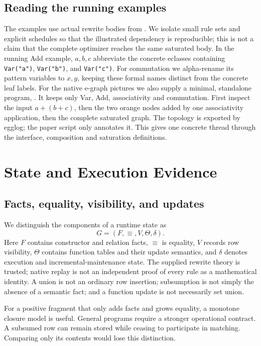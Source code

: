 \documentclass[11pt,a4paper]{article}
\newcommand{\code}[1]{\texttt{#1}}
\begin{document}
\subsection{Reading the running examples}
The examples use actual rewrite bodies from
. We isolate small rule sets and explicit
schedules so that the illustrated dependency is reproducible; this is not a
claim that the complete optimizer reaches the same saturated body. In the
running Add example, $a,b,c$ abbreviate the concrete eclasses containing
\code{Var("a")}, \code{Var("b")}, and \code{Var("c")}.
For commutation we alpha-rename its pattern variables to $x,y$, keeping these
formal names distinct from the concrete leaf labels.
For the native e-graph pictures we also supply a minimal, standalone program,
. It keeps only Var, Add, associativity and
commutation. First inspect the input $a+(b+c)$, then the two orange nodes added by
one associativity application, then the complete saturated graph. The topology is
exported by egglog; the paper script only annotates it. This gives one concrete
thread through the interface, composition and saturation definitions.

\MathLegend
\MathSharingComparison

\section{State and Execution Evidence}
\subsection{Facts, equality, visibility, and updates}
We distinguish the components of a runtime state as
\begin{equation}
 G=(F,\equiv,V,\Theta,\delta).
\end{equation}
Here $F$ contains constructor and relation facts, $\equiv$ is equality,
$V$ records row visibility, $\Theta$ contains function tables and their update
semantics, and $\delta$ denotes execution and incremental-maintenance state.
The supplied rewrite theory is trusted; native replay is not an independent
proof of every rule as a mathematical identity. A union is not an ordinary row insertion; subsumption is not simply the absence
of a semantic fact; and a function update is not necessarily set union.

For a positive fragment that only adds facts and grows equality, a monotone
closure model is useful. General programs require a stronger operational
contract. A subsumed row can remain stored while ceasing to participate in
matching. Comparing only its contents would lose this distinction.
\end{document}
